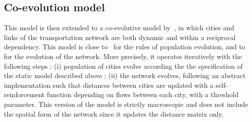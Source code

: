 \documentclass[11pt]{article}
\begin{document}
\subsection{Co-evolution model}


This model is then extended to a co-evolutive model by~\cite{raimbault2018modeling}, in which cities and links of the transportation network are both dynamic and within a reciprocal dependency. This model is close to~\cite{schmitt2014modelisation} for the rules of population evolution, and to~\cite{baptistemodeling} for the evolution of the network. More precisely, it operates iteratively with the following steps : (i) population of cities evolve according the the specification of the static model described above ; (ii) the network evolves, following an abstract implementation such that distances between cities are updated with a self-reinforcement function depending on flows between each city, with a threshold parameter. This version of the model is strictly macroscopic and does not include the spatial form of the network since it updates the distance matrix only.
\end{document}
